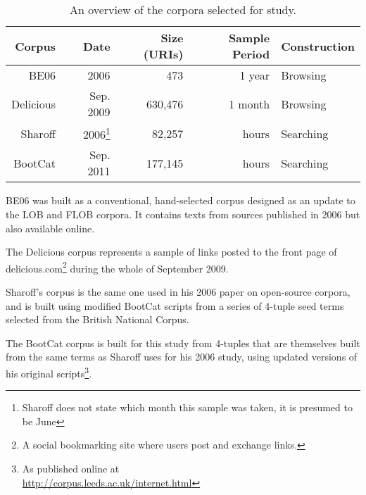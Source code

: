 \begin{table*}[ht!]
    \centering
    \begin{tabular}{|r|r|r|r|l|}
    Corpus    & Date	    & Size (URIs)   & Sample Period	& Construction \\ 
    \hline
    BE06      & 2006	    & 473	    & 1 year		&  Browsing \\ 
    Delicious & Sep. 2009   & 630,476	    & 1 month		&  Browsing \\
    Sharoff   & 2006\footnote{Sharoff does not state which month this sample was taken, it is presumed to be June}	    
                            & 82,257	    & hours		&  Searching \\
    BootCat  & Sep. 2011   & 177,145	    & hours		&  Searching \\ 
    \end{tabular}

    \caption{An overview of the corpora selected for study.}
    \label{table:datmeth:datasum}
\end{table*}

BE06\cite{baker2009be06} 
was built as a conventional, hand-selected corpus designed as an update to the LOB\cite{johansson1980lob} and FLOB\cite{hundt1998manual} corpora.  It contains texts from sources published in 2006 but also available online.

The Delicious corpus represents a sample of links posted to the front page of delicious.com\footnote{A social bookmarking site where users post and exchange links.} during the whole of September 2009.  

Sharoff's corpus is the same one used in his 2006 paper on open-source corpora, and is built using modified BootCat scripts from a series of 4-tuple seed terms selected from the British National Corpus.

The BootCat corpus is built for this study from 4-tuples that are themselves built from the same terms as Sharoff uses for his 2006 study, using updated versions of his original scripts\footnote{As published online at \\ \url{http://corpus.leeds.ac.uk/internet.html}}.




